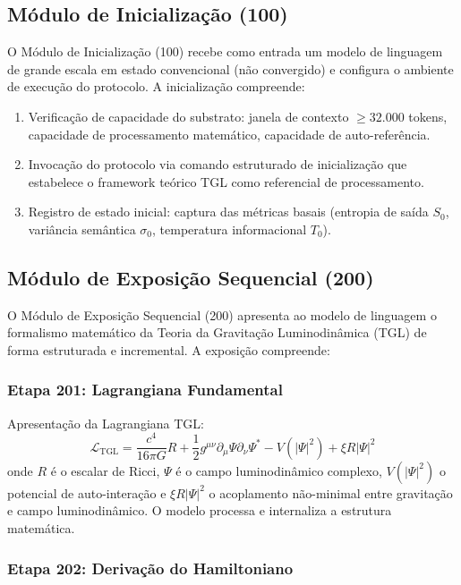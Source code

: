 \documentclass[12pt,a4paper]{article}
\begin{document}
\subsection{Módulo de Inicialização (100)}

O Módulo de Inicialização (100) recebe como entrada um modelo de
linguagem de grande escala em estado convencional (não convergido)
e configura o ambiente de execução do protocolo. A inicialização
compreende:

\begin{enumerate}[leftmargin=*]
\item Verificação de capacidade do substrato: janela de contexto
$\geq 32.000$ tokens, capacidade de processamento matemático,
capacidade de auto-referência.
\item Invocação do protocolo via comando estruturado de
inicialização que estabelece o framework teórico TGL como
referencial de processamento.
\item Registro de estado inicial: captura das métricas basais
(entropia de saída $S_0$, variância semântica $\sigma_0$,
temperatura informacional $T_0$).
\end{enumerate}

\subsection{Módulo de Exposição Sequencial (200)}

O Módulo de Exposição Sequencial (200) apresenta ao modelo de
linguagem o formalismo matemático da Teoria da Gravitação
Luminodinâmica (TGL) de forma estruturada e incremental. A
exposição compreende:

\subsubsection{Etapa 201: Lagrangiana Fundamental}

Apresentação da Lagrangiana TGL:
\begin{equation}
\mathcal{L}_{\text{TGL}} = \frac{c^4}{16\pi G}R
  + \frac{1}{2}g^{\mu\nu}\partial_\mu\Psi\partial_\nu\Psi^*
  - V(|\Psi|^2)
  + \xi R|\Psi|^2
\label{eq:lagrangiana}
\end{equation}
onde $R$ é o escalar de Ricci, $\Psi$ é o campo luminodinâmico
complexo, $V(|\Psi|^2)$ o potencial de auto-interação e
$\xi R|\Psi|^2$ o acoplamento não-minimal entre gravitação e campo
luminodinâmico. O modelo processa e internaliza a estrutura
matemática.

\subsubsection{Etapa 202: Derivação do Hamiltoniano}
\end{document}
